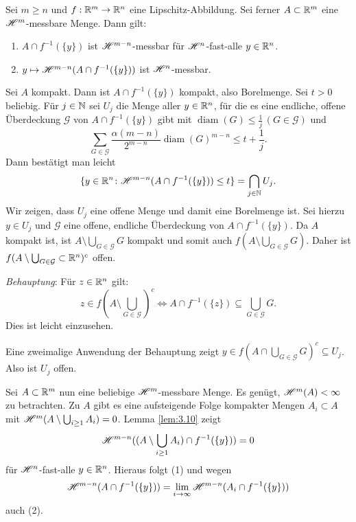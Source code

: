 \documentclass[a4paper,twoside,DIV15,BCOR12mm]{scrbook}
\newcommand{\HM}{\H}
\DeclareMathOperator{\diam}{diam}
\begin{document}
\begin{lemma}\label{lem:3.11}
Sei \(m\geq n\) und \(f:\mathbb{R}^m\to\mathbb{R}^n\) eine Lipschitz-Abbildung. Sei ferner \(A \subset \mathbb{R}^m\) eine \(\HM^m\)-messbare Menge. Dann gilt:
\begin{enumerate}[(1)]
\item \(A\cap f^{-1}(\{y\})\) ist \(\HM^{m-n}\)-messbar für \(\HM^n\)-fast-alle \(y \in \mathbb{R}^n\).
\item \(y\mapsto\HM^{m-n}(A\cap f^{-1}(\{y\}))\) ist \(\HM^n\)-messbar.
\end{enumerate}
\end{lemma}
\begin{beweis}
Sei \(A\) kompakt. Dann ist \(A\cap f^{-1}(\{y\})\) kompakt, also Borelmenge. Sei \(t>0\) beliebig. Für \(j \in \mathbb{N}\) sei \(U_j\) die Menge aller \(y\in\mathbb{R}^n\), für die es eine endliche, offene Überdeckung \(\mathcal G\) von \(A \cap f^{-1}(\{y\})\) gibt mit \(\diam(G) \leq \frac1j \, (G \in \mathcal G)\) und 
$$
\sum_{G\in \mathcal G} \frac{\alpha(m-n)}{2^{m-n}} \diam(G)^{m-n} \leq t + \frac1j.
$$ 
Dann bestätigt man leicht
\[
\{y\in\MdR^n \colon \HM^{m-n}(A\cap f^{-1}(\{y\})) \leq t\} = \bigcap_{j\in\MdN} U_j.
\]
Wir zeigen, dass \(U_j\) eine offene Menge und damit eine Borelmenge ist. Sei hierzu \(y\in U_j\) und  \(\mathcal G\) eine offene, endliche Überdeckung von \(A \cap f^{-1}(\{y\})\). Da \(A\) kompakt ist, ist \(A \setminus \bigcup_{G \in \mathcal G} G\) kompakt und somit auch \(f(A\setminus \bigcup_{G\in\mathcal G} G)\). Daher ist \(f(A \setminus \bigcup_{G\in\mathcal G} \subset \mathbb{R}^n)^c\) offen.
\par
\emph{Behauptung}: Für \(z \in \mathbb{R}^n\) gilt: 
$$
z \in f(A \setminus \bigcup_{G\in\mathcal G})^c \Leftrightarrow A \cap f^{-1}(\{z\}) \subseteq \bigcup_{G\in\mathcal G} G.
$$ 
Dies ist leicht einzusehen. 


Eine zweimalige Anwendung der Behauptung zeigt 
\(y\in f(A \cap \bigcup_{G\in\mathcal G} G)^c \subseteq U_j\). Also ist \(U_j\) offen.
\par
Sei \(A \subset \mathbb{R}^m\) nun eine beliebige \(\HM^m\)-messbare Menge. Es genügt, \(\HM^m(A)<\infty\) zu betrachten. Zu $A$ gibt es eine aufsteigende Folge kompakter Mengen \( A_i  \subset A\) mit \(\HM^m(A \setminus \bigcup_{i\geq1}A_i)=0\). Lemma \ref{lem:3.10} zeigt 
\[
\HM^{m-n}((A\setminus\bigcup_{i\geq1}A_i)\cap f^{-1}(\{y\})) = 0
\]
für \(\HM^n\)-fast-alle \(y\in\mathbb{R}^n\). Hieraus folgt (1) und wegen 
$$
\HM^{m-n}(A\cap f^{-1}(\{y\})) = \lim_{i\to\infty} \HM^{m-n}(A_i\cap f^{-1}(\{y\}))
$$ 
auch (2).
\end{beweis}
\end{document}
